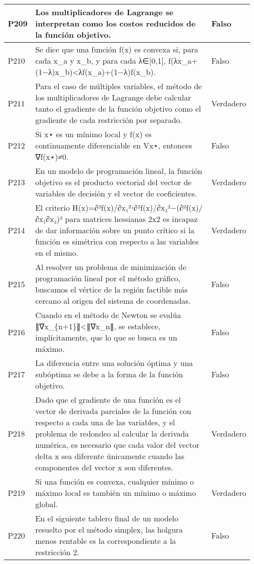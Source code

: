 \documentclass{article}
\begin{document}
\begin{longtable}{|>{\centering\arraybackslash}p{1.5cm}|>{\raggedright\arraybackslash}p{14cm}|>{\centering\arraybackslash}p{2cm}|}
\hline
P209 & Los multiplicadores de Lagrange se interpretan como los costos reducidos de la función objetivo. & Falso \\
\hline
P210 & Se dice que una función f(x) es convexa si, para cada x\_a y x\_b, y para cada λ∈[0,1], f(λx\_a+(1−λ)x\_b)<λf(x\_a)+(1−λ)f(x\_b). & Falso \\
\hline
P211 & Para el caso de múltiples variables, el método de los multiplicadores de Lagrange debe calcular tanto el gradiente de la función objetivo como el gradiente de cada restricción por separado. & Verdadero \\
\hline
P212 & Si x⋆ es un mínimo local y f(x) es continuamente diferenciable en Vx⋆, entonces ∇f(x⋆)≠0. & Falso \\
\hline
P213 & En un modelo de programación lineal, la función objetivo es el producto vectorial del vector de variables de decisión y el vector de coeficientes. & Verdadero \\
\hline
P214 & El criterio H(x)=∂²f(x)/∂x₁²⋅∂²f(x)/∂x₂²−(∂²f(x)/∂x₁∂x₂)² para matrices hessianas 2x2 es incapaz de dar información sobre un punto crítico si la función es simétrica con respecto a las variables en el mismo. & Verdadero \\
\hline
P215 & Al resolver un problema de minimización de programación lineal por el método gráfico, buscamos el vértice de la región factible más cercano al origen del sistema de coordenadas. & Falso \\
\hline
P216 & Cuando en el método de Newton se evalúa ∥∇x\_\{n+1\}∥<∥∇x\_n∥, se establece, implícitamente, que lo que se busca es un máximo. & Falso \\
\hline
P217 & La diferencia entre una solución óptima y una subóptima se debe a la forma de la función objetivo. & Falso \\
\hline
P218 & Dado que el gradiente de una función es el vector de derivada parciales de la función con respecto a cada una de las variables, y el problema de redondeo al calcular la derivada numérica, es necesario que cada valor del vector delta x sea diferente únicamente cuando las componentes del vector x son diferentes. & Verdadero \\
\hline
P219 & Si una función es convexa, cualquier mínimo o máximo local es también un mínimo o máximo global. & Verdadero \\
\hline
P220 & En el siguiente tablero final de un modelo resuelto por el método simplex, las holgura menos rentable es la correspondiente a la restricción 2. & Falso \\
\hline

\end{longtable}
\end{document}
